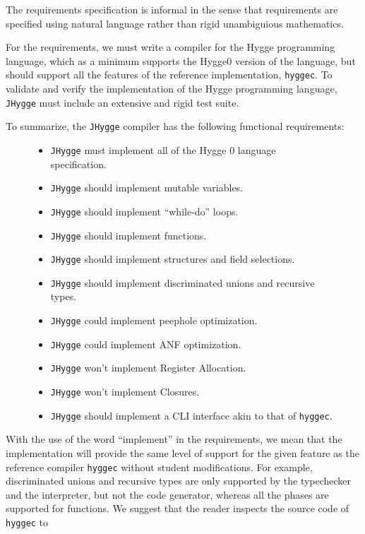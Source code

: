The requirements specification is informal in the sense that requirements are specified using natural language rather than rigid unambiguious mathematics.

For the requirements, we must write a compiler for the Hygge programming language, which as a minimum supports the Hygge0 version of the language,
but should support all the features of the reference implementation, \texttt{hyggec}.
To validate and verify the implementation of the Hygge programming language, \texttt{JHygge} must include an extensive and rigid test suite.

To summarize, the \texttt{JHygge} compiler has the following functional requirements:

\begin{figure}[H]
\centering  
\begin{itemize}
  \item \texttt{JHygge} must implement all of the Hygge 0 language specification.
  \item \texttt{JHygge} should implement mutable variables.
  \item \texttt{JHygge} should implement ``while-do'' loops.
  \item \texttt{JHygge} should implement functions.
  \item \texttt{JHygge} should implement structures and field selections.
  \item \texttt{JHygge} should implement discriminated unions and recursive types.
  \item \texttt{JHygge} could implement peephole optimization.
  \item \texttt{JHygge} could implement ANF optimization.
  \item \texttt{JHygge} won't implement Register Allocation.
  \item \texttt{JHygge} won't implement Closures.
  \item \texttt{JHygge} should implement a CLI interface akin to that of \texttt{hyggec}.
\end{itemize}
\caption{}
\label{}
\end{figure}

With the use of the word ``implement'' in the requirements, we mean that the implementation will provide the same level of support
for the given feature as the reference compiler \texttt{hyggec} without student modifications. For example, discriminated unions
and recursive types are only supported by the typechecker and the interpreter, but not the code generator, whereas all the phases
are supported for functions. We suggest that the reader inspects the source code of \texttt{hyggec} to 

